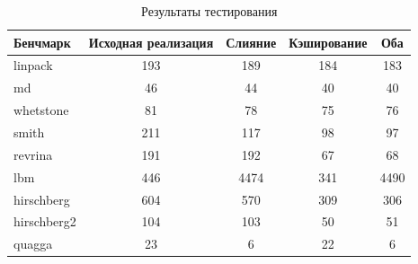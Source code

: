 \begin{table}[h!]
\label{tabl:Profiling}
\begin{tabular}{l | c | c | c | c }
Бенчмарк & Исходная реализация & Слияние & Кэширование & Оба \\
\hline \hline
linpack & 193 & 189 & 184 & 183 \\
md & 46 & 44 & 40 & 40\\ 
whetstone & 81 & 78 & 75 & 76\\
smith & 211 & 117 & 98 & 97\\
revrina & 191 & 192 & 67 & 68\\
lbm & 446 & 4474 & 341 & 4490\\
hirschberg & 604 & 570 & 309 & 306\\
hirschberg2 & 104 & 103 & 50 & 51\\
quagga & 23 & 6 & 22 & 6
\end{tabular}
\caption{Результаты тестирования}
\end{table}

\newpage %

\printbibliography[
    heading=bibintoc%
    ,title=Библиография %
]

